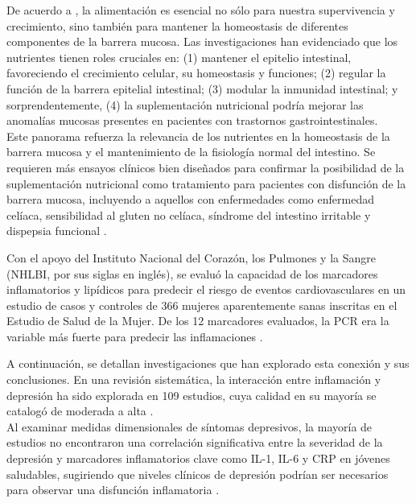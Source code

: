 \documentclass[jou]{apa7}
\begin{document}
	De acuerdo a \parencite{Farre2020}, la alimentación es esencial no sólo
	para nuestra supervivencia y crecimiento, sino también para mantener la
	homeostasis de diferentes componentes de la barrera mucosa. Las
	investigaciones han evidenciado que los nutrientes tienen roles
	cruciales en: (1) mantener el epitelio intestinal, favoreciendo el
	crecimiento celular, su homeostasis y funciones; (2) regular la función
	de la barrera epitelial intestinal; (3) modular la inmunidad intestinal;
	y sorprendentemente, (4) la suplementación nutricional podría mejorar
	las anomalías mucosas presentes en pacientes con trastornos
	gastrointestinales.\\
	
	Este panorama refuerza la relevancia de los nutrientes en la homeostasis
	de la barrera mucosa y el mantenimiento de la fisiología normal del
	intestino. Se requieren más ensayos clínicos bien diseñados para
	confirmar la posibilidad de la suplementación nutricional como
	tratamiento para pacientes con disfunción de la barrera mucosa,
	incluyendo a aquellos con enfermedades como enfermedad celíaca,
	sensibilidad al gluten no celíaca, síndrome del intestino irritable y
	dispepsia funcional \parencite{Farre2020}.
	
	Con el apoyo del Instituto Nacional del Corazón, los Pulmones y la
	Sangre (NHLBI, por sus siglas en inglés), se evaluó la capacidad de los
	marcadores inflamatorios y lipídicos para predecir el riesgo de eventos
	cardiovasculares en un estudio de casos y controles de 366 mujeres
	aparentemente sanas inscritas en el Estudio de Salud de la Mujer. De los
	12 marcadores evaluados, la PCR era la variable más fuerte para predecir
	las inflamaciones \parencite{ridkerHighsensitivityCreactiveProtein2004}.
	
	A continuación, se detallan investigaciones que han explorado esta
	conexión y sus conclusiones. En una revisión sistemática, la interacción
	entre inflamación y depresión ha sido explorada en 109 estudios, cuya
	calidad en su mayoría se catalogó de moderada a alta \parencite{Toenders2022}.\\
	
	Al examinar medidas dimensionales de síntomas depresivos, la mayoría de
	estudios no encontraron una correlación significativa entre la severidad
	de la depresión y marcadores inflamatorios clave como IL-1\textbeta, IL-6 y CRP
	en jóvenes saludables, sugiriendo que niveles clínicos de depresión
	podrían ser necesarios para observar una disfunción inflamatoria
	\parencite{Toenders2022}.\\
	
\end{document}

